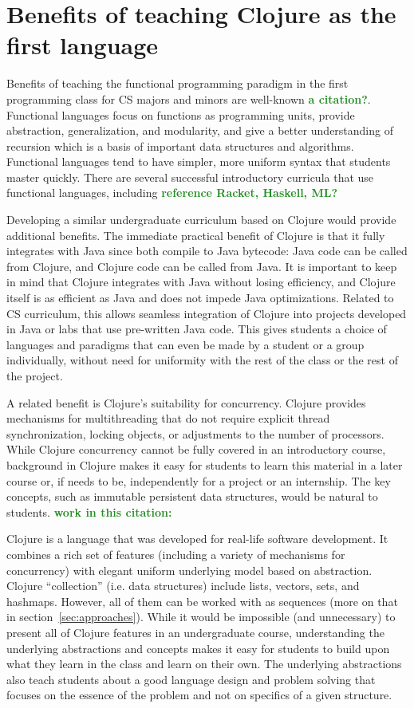 \documentclass[submission,copyright,creativecommons]{eptcs}
\newcommand{\allcomments}[1]{{#1}}
\newcommand{\elenacomment}[1]{{\bf \textcolor{ForestGreen}{\allcomments{{#1}}}}}
\begin{document}
\section{Benefits of teaching Clojure as the first language}
Benefits of teaching the functional programming paradigm in the first programming class for CS majors and minors are well-known \elenacomment{a citation?}. Functional languages focus on functions as programming units, provide abstraction, generalization, and modularity, and give a better understanding of recursion which is a basis of important data structures and algorithms. Functional languages tend to have simpler, more uniform syntax that students master quickly. There are several successful introductory curricula that use functional languages, including \elenacomment{reference Racket, Haskell, ML?}

Developing a similar undergraduate curriculum based on Clojure would provide additional benefits. The immediate practical benefit of Clojure is that it fully integrates with Java since both compile to Java bytecode: Java code can be called from Clojure, and Clojure code can be called from Java. It is important to keep in mind that Clojure integrates with Java without losing efficiency, and Clojure itself is as efficient as Java and does not impede Java optimizations. Related to CS curriculum, this allows seamless integration of Clojure into projects developed in Java or labs that use pre-written Java code. This gives students a choice of languages and paradigms that can even be made by a student or a group individually, without need for uniformity with the rest of the class or the rest of the project. 

A related benefit is Clojure's suitability for concurrency. Clojure provides mechanisms for multithreading that do not require explicit thread synchronization, locking objects, or adjustments to the number of processors. While Clojure concurrency cannot be fully covered in an introductory course, background in Clojure makes it easy for students to learn this material in a later course or, if needs to be, independently for a project or an internship. The key concepts, such as immutable persistent data structures, would be natural to students. \elenacomment{work in this citation: ~\cite{Brown:2010}}

Clojure is a language that was developed for real-life software development. It combines a rich set of features (including a variety of mechanisms for concurrency) with elegant uniform underlying model based on abstraction. Clojure ``collection'' (i.e. data structures) include lists, vectors, sets, and hashmaps. However, all of them can be worked with as sequences (more on that in section~\ref{sec:approaches}). While it would be impossible (and unnecessary) to present all of Clojure features in an undergraduate course, understanding the underlying abstractions and concepts makes it easy for students to build upon what they learn in the class and learn on their own. The underlying abstractions also teach students about a good language design and problem solving that focuses on the essence of the problem and not on specifics of a given structure. 
\end{document}
